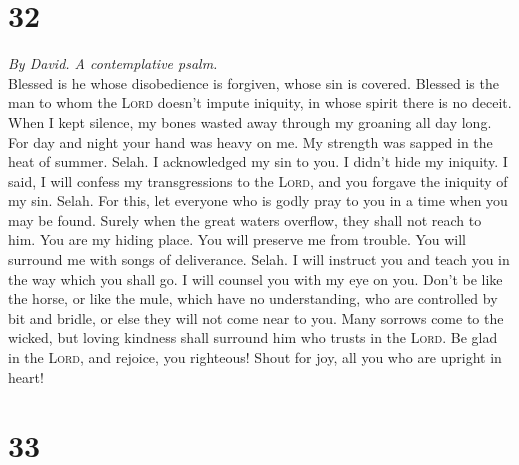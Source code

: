\hypertarget{section-31}{%
\section{32}\label{section-31}}

\emph{By David. A contemplative psalm.}\\
 Blessed is he whose disobedience is forgiven, whose sin
is covered.  Blessed is the man to whom the \textsc{Lord}
doesn't impute iniquity, in whose spirit there is no deceit.
 When I kept silence, my bones wasted away through my
groaning all day long.  For day and night your hand was
heavy on me. My strength was sapped in the heat of summer. Selah.
 I acknowledged my sin to you. I didn't hide my iniquity.
I said, I will confess my transgressions to the \textsc{Lord}, and you
forgave the iniquity of my sin. Selah.  For this, let
everyone who is godly pray to you in a time when you may be found.
Surely when the great waters overflow, they shall not reach to him.
 You are my hiding place. You will preserve me from
trouble. You will surround me with songs of deliverance. Selah.
 I will instruct you and teach you in the way which you
shall go. I will counsel you with my eye on you.  Don't be
like the horse, or like the mule, which have no understanding, who are
controlled by bit and bridle, or else they will not come near to you.
 Many sorrows come to the wicked, but loving kindness
shall surround him who trusts in the \textsc{Lord}.  Be
glad in the \textsc{Lord}, and rejoice, you righteous! Shout for joy,
all you who are upright in heart!

\hypertarget{section-32}{%
\section{33}\label{section-32}}

